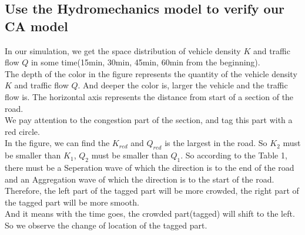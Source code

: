 \documentclass{mcmthesis}
\begin{document}
\subsection{Use the Hydromechanics model to verify our CA model}
\indent In our simulation, we get the space distribution of vehicle density $K$ and traffic flow $Q$ in some time(15min, 30min, 45min, 60min from the beginning).\\
\indent The depth of the color in the figure represents the quantity of the vehicle density $K$ and traffic flow $Q$. And deeper the color is, larger the vehicle and the traffic flow is. The horizontal axis represents the distance from start of a section of the road.\\
\indent We pay attention to the congestion part of the section, and tag this part with a red circle.\\
\indent In the figure, we can find the $K_{red}$ and $Q_{red}$ is the largest in the road. So $K_{2}$ must be smaller than $K_{1}$, $Q_{2}$ must be smaller than $Q_{1}$. So according to the Table 1, there must be a Seperation wave of which the direction is to the end of the road  and an Aggregation wave of which the direction is to the start of the road.\\
\indent Therefore, the left part of the tagged part will be more crowded, the right part of the tagged part will be more smooth.\\
\indent And it means with the time goes, the crowded part(tagged) will shift to the left.\\
\indent So we observe the change of location of the tagged part.\\
\end{document}
